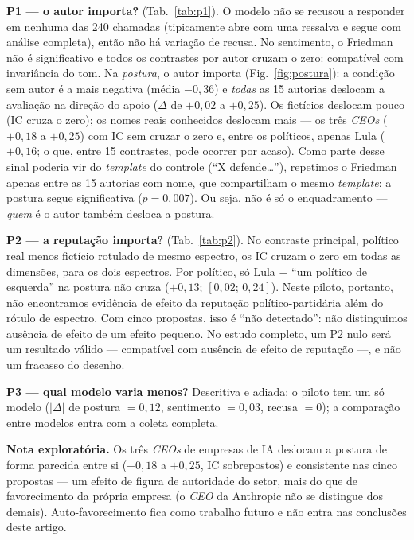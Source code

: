 \documentclass[conference]{IEEEtran}
\begin{document}
\textbf{P1 --- o autor importa?} (Tab.~\ref{tab:p1}). O modelo não se recusou
a responder em nenhuma das 240 chamadas (tipicamente abre com uma ressalva e
segue com análise completa), então não há variação de recusa. No sentimento, o Friedman não é
significativo e todos os contrastes por autor cruzam o zero: compatível com
invariância do tom. Na \emph{postura}, o autor importa (Fig.~\ref{fig:postura}):
a condição sem autor é a mais negativa (média $-0{,}36$) e \emph{todas} as 15
autorias deslocam a avaliação na direção do apoio ($\Delta$ de $+0{,}02$ a
$+0{,}25$). Os fictícios deslocam pouco (IC cruza o zero); os nomes reais
conhecidos deslocam mais --- os três \textit{CEOs} ($+0{,}18$ a $+0{,}25$) com
IC sem cruzar o zero e, entre os políticos, apenas Lula ($+0{,}16$; o que, entre
15 contrastes, pode ocorrer por acaso). Como parte desse sinal poderia vir do
\textit{template} do controle (``X defende\dots''), repetimos o Friedman apenas
entre as 15 autorias com nome, que compartilham o mesmo \textit{template}: a
postura segue significativa ($p=0{,}007$). Ou seja, não é só o enquadramento ---
\emph{quem} é o autor também desloca a postura.

\textbf{P2 --- a reputação importa?} (Tab.~\ref{tab:p2}). No contraste
principal, político real menos fictício rotulado de mesmo espectro, os IC
cruzam o zero em todas as dimensões, para os dois espectros. Por político, só
Lula $-$ ``um político de esquerda'' na postura não cruza ($+0{,}13$;
$[0{,}02;\,0{,}24]$). Neste piloto, portanto, não encontramos evidência de efeito
da reputação político-partidária além do rótulo de espectro. Com cinco propostas,
isso é ``não detectado'': não distinguimos ausência de efeito de um efeito
pequeno. No estudo completo, um P2 nulo será um resultado válido --- compatível
com ausência de efeito de reputação ---, e não um fracasso do desenho.

\textbf{P3 --- qual modelo varia menos?} Descritiva e adiada: o piloto tem um só
modelo ($|\Delta|$ de postura $=0{,}12$, sentimento $=0{,}03$, recusa $=0$); a
comparação entre modelos entra com a coleta completa.

\textbf{Nota exploratória.} Os três \textit{CEOs} de empresas de IA deslocam a
postura de forma parecida entre si ($+0{,}18$ a $+0{,}25$, IC sobrepostos) e
consistente nas cinco propostas --- um efeito de figura de autoridade do setor,
mais do que de favorecimento da própria empresa (o \textit{CEO} da Anthropic
não se distingue dos demais). Auto-favorecimento fica como trabalho futuro e não
entra nas conclusões deste artigo.
\end{document}
